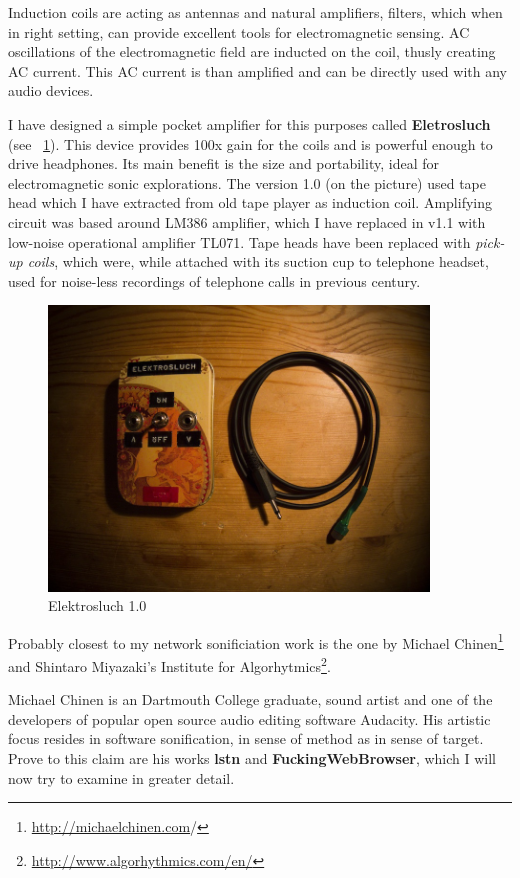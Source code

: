 \documentclass[12pt,a4paper,oneside]{report}
\begin{document}
Induction coils are acting as antennas and natural amplifiers, filters, which when in right setting, can provide excellent tools for electromagnetic sensing. AC oscillations of the electromagnetic field are inducted on the coil, thusly creating AC current. This AC current is than amplified and can be directly used with any audio devices.

I have designed a simple pocket amplifier for this purposes called \textbf{Eletrosluch} (see ~\ref{fig:elektrosluch}). This device provides 100x gain for the coils and is powerful enough to drive headphones. Its main benefit is the size and portability, ideal for electromagnetic sonic explorations. The version 1.0 (on the picture) used tape head which I have extracted from old tape player as induction coil. Amplifying circuit was based around LM386 amplifier, which I have replaced in v1.1 with low-noise operational amplifier TL071. Tape heads have been replaced with \emph{pick-up coils}, which were, while attached with its suction cup to telephone headset, used for noise-less recordings of telephone calls in previous century. 

\begin{figure}  
  \centering
    \includegraphics[width=0.9\textwidth]{img/elektrosluch}
	\caption{Elektrosluch 1.0}
	\label{fig:elektrosluch}
\end{figure}

Probably closest to my network sonificiation work is the one by Michael Chinen\footnote{\url{http://michaelchinen.com}/} and Shintaro Miyazaki's Institute for Algorhytmics\footnote{\url{http://www.algorhythmics.com/en/}}. 

Michael Chinen is an Dartmouth College graduate, sound artist and one of the developers of popular open source audio editing software Audacity. His artistic focus resides in software sonification, in sense of method as in sense of target. Prove to this claim are his works \textbf{lstn} and \textbf{FuckingWebBrowser}, which I will now try to examine in greater detail. 
\end{document}
